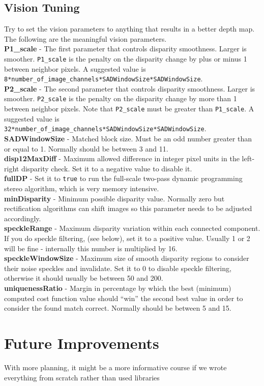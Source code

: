 \documentclass[11pt]{article}
\begin{document}
\subsection{Vision Tuning}
Try to set the vision parameters to anything that results in a better depth map. The following are the meaningful vision parameters.\\
\textbf{P1\_scale} - The first parameter that controls disparity smoothness. Larger is smoother. \texttt{P1\_scale} is the penalty on the disparity change by plus or minus 1 between neighbor pixels.  A suggested value is \texttt{8*number\_of\_image\_channels\-*SADWindowSize*SADWindowSize}. \\
\textbf{P2\_scale} - The second parameter that controls disparity smoothness. Larger is smoother.  \texttt{P2\_scale} is the penalty on the disparity change by more than 1 between neighbor pixels. Note that \texttt{P2\_scale} must be greater than \texttt{P1\_scale}. A suggested value is \texttt{32*number\_of\_image\_channels*SADWindow\-Size*SADWindowSize}. \\
\textbf{SADWindowSize} - Matched block size. Must be an odd number greater than or equal to 1. Normally should be between 3 and 11. \\
\textbf{disp12MaxDiff} - Maximum allowed difference in integer pixel units in the left-right disparity check. Set it to a negative value to disable it. \\
\textbf{fullDP} - Set it to \texttt{true} to run the full-scale two-pass dynamic programming stereo algorithm, which is very memory intensive. \\
\textbf{minDisparity} - Minimum possible disparity value. Normally zero but rectification algorithms can shift images so this parameter needs to be adjusted accordingly. \\
\textbf{speckleRange} - Maximum disparity variation within each connected component. If you do speckle filtering, (see below), set it to a positive value. Usually 1 or 2 will be fine - internally this number is multiplied by 16. \\
\textbf{speckleWindowSize} - Maximum size of smooth disparity regions to consider their noise speckles and invalidate. Set it to 0 to disable speckle filtering, otherwise it should usually be between 50 and 200. \\
\textbf{uniquenessRatio} - Margin in percentage by which the best (minimum) computed cost function value should ``win'' the second best value in order to consider the found match correct. Normally should be between 5 and 15.
\section{Future Improvements}
With more planning, it might be a more informative course if we wrote everything from scratch rather than used libraries
\end{document}
